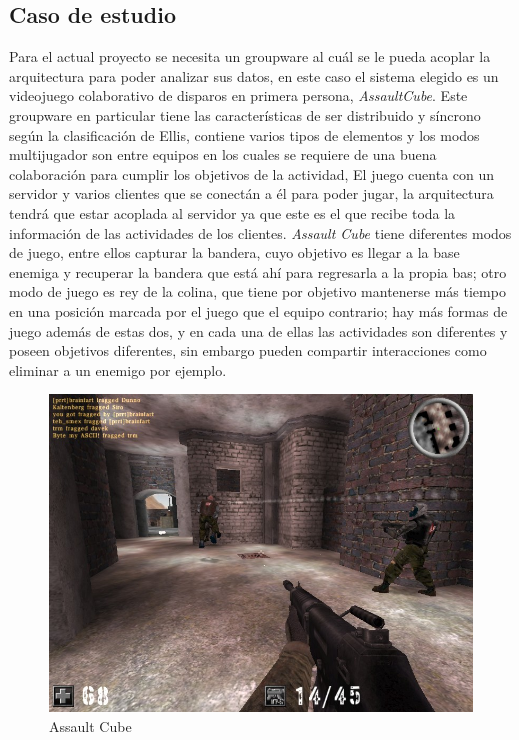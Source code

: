 \subsection{Caso de estudio}

Para el actual proyecto se necesita un groupware al cu\'al se le pueda acoplar la arquitectura para poder analizar sus datos, en este caso el sistema elegido es un videojuego colaborativo de disparos en primera persona, \textit{AssaultCube}. Este groupware en particular tiene las caracter\'isticas de ser distribuido y s\'incrono seg\'un la clasificaci\'on de Ellis\cite{ellis1991groupware}, contiene varios tipos de elementos y los modos multijugador son entre equipos en los cuales se requiere de una buena colaboraci\'on para cumplir los objetivos de la actividad, El juego cuenta con un servidor y varios clientes que se conect\'an a \'el para poder jugar, la arquitectura tendr\'a que estar acoplada al servidor ya que este es el que recibe toda la informaci\'on de las actividades de los clientes. \textit{Assault Cube} tiene diferentes modos de juego, entre ellos capturar la bandera, cuyo objetivo es llegar a la base enemiga y recuperar la bandera que est\'a ah\'i para regresarla a la propia bas; otro modo de juego es rey de la colina, que tiene por objetivo mantenerse m\'as tiempo en una posici\'on marcada por el juego que el equipo contrario; hay m\'as formas de juego adem\'as de estas dos, y en cada una de ellas las actividades son diferentes y poseen objetivos diferentes, sin embargo pueden compartir interacciones como eliminar a un enemigo por ejemplo.

\begin{figure}[h!]
\centering
\includegraphics[scale=.15]{images/assaultcube}
\caption{Assault Cube}
\label{gw:asscb}
\end{figure}


